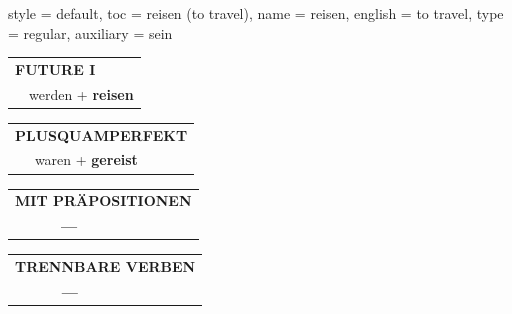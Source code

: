 \begin{verbentry}{
  style = {default},
  toc = {reisen (to travel)},
  name = {reisen},
  english = {to travel},
  type = {regular},
  auxiliary = {sein}
}
\begin{tabular}{rl}
    \multicolumn{2}{l}{\textbf{FUTURE I} }\\
  &  werden + \textbf{reisen}\\
 
  \end{tabular}
\hfill
   \begin{tabular}{rl}
      \multicolumn{2}{l}{\textbf{PLUSQUAMPERFEKT}}\\
  &  waren + \textbf{gereist}\\
  \end{tabular}
  
  \vspace{10pt}



\begin{tabular}{lll}
\multicolumn{3}{l}{\textbf{MIT PRÄPOSITIONEN}}\\
& \textbf{---} & \\
\end{tabular}
\hfill
\begin{tabular}{lll}
\multicolumn{3}{l}{\textbf{TRENNBARE VERBEN}}\\
& \textbf{---} & \\
\end{tabular}

  \vspace{-5pt}
\end{verbentry}

